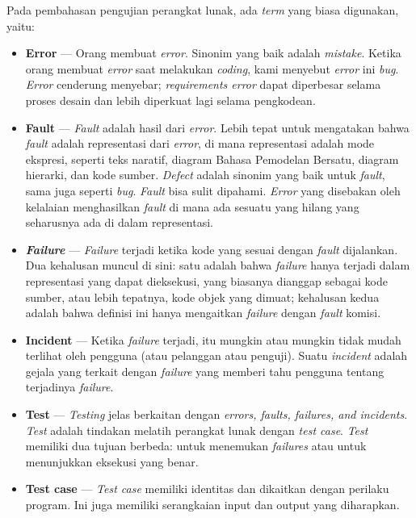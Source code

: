 \documentclass[a4paper,twoside]{article}
\begin{document}
\begin{enumerate}
Pada pembahasan pengujian perangkat lunak, ada \textit{term} yang biasa digunakan, yaitu:
\begin{itemize}
\item \textbf{Error} --- Orang membuat \textit{error}. Sinonim yang baik adalah \textit{mistake}. Ketika orang membuat \textit{error} saat melakukan \textit{coding}, kami menyebut \textit{error} ini \textit{bug}. \textit{Error} cenderung menyebar; \textit{requirements error} dapat diperbesar selama proses desain dan lebih diperkuat lagi selama pengkodean.
\item \textbf{Fault} --- \textit{Fault} adalah hasil dari \textit{error}. Lebih tepat untuk mengatakan bahwa \textit{fault} adalah representasi dari \textit{error}, di mana representasi adalah mode ekspresi, seperti teks naratif, diagram Bahasa Pemodelan Bersatu, diagram hierarki, dan kode sumber. \textit{Defect} adalah sinonim yang baik untuk \textit{fault}, sama juga seperti \textit{bug}. \textit{Fault} bisa sulit dipahami. \textit{Error} yang disebakan oleh kelalaian menghasilkan \textit{fault} di mana ada sesuatu yang hilang yang seharusnya ada di dalam representasi.
\item \textit{\textbf{Failure}} --- \textit{Failure} terjadi ketika kode yang sesuai dengan \textit{fault} dijalankan. Dua kehalusan muncul di sini: satu adalah bahwa \textit{failure} hanya terjadi dalam representasi yang dapat dieksekusi, yang biasanya dianggap sebagai kode sumber, atau lebih tepatnya, kode objek yang dimuat; kehalusan kedua adalah bahwa definisi ini hanya mengaitkan \textit{failure} dengan \textit{fault} komisi.
\item \textbf{Incident} --- Ketika \textit{failure} terjadi, itu mungkin atau mungkin tidak mudah terlihat oleh pengguna (atau pelanggan atau penguji). Suatu \textit{incident} adalah gejala yang terkait dengan \textit{failure} yang memberi tahu pengguna tentang terjadinya \textit{failure}.
\item \textbf{Test} --- \textit{Testing} jelas berkaitan dengan  \textit{errors, faults, failures, and incidents}. \textit{Test} adalah tindakan melatih perangkat lunak dengan \textit{test case}. \textit{Test} memiliki dua tujuan berbeda: untuk menemukan \textit{failures} atau untuk menunjukkan eksekusi yang benar.
\item \textbf{Test case} --- \textit{Test case} memiliki identitas dan dikaitkan dengan perilaku program. Ini juga memiliki serangkaian input dan output yang diharapkan.
\end{itemize}
\begin{figure}

\end{figure}
\end{enumerate}
\end{document}

